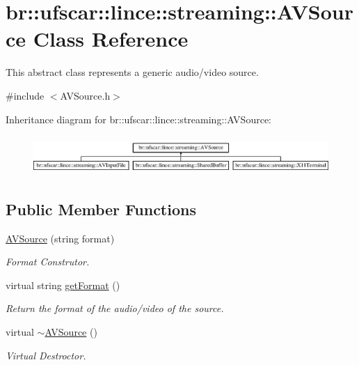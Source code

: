 \hypertarget{classbr_1_1ufscar_1_1lince_1_1streaming_1_1AVSource}{
\section{br::ufscar::lince::streaming::AVSource Class Reference}
\label{classbr_1_1ufscar_1_1lince_1_1streaming_1_1AVSource}
}


This abstract class represents a generic audio/video source.  




{\ttfamily \#include $<$AVSource.h$>$}

Inheritance diagram for br::ufscar::lince::streaming::AVSource:\begin{figure}[H]
\begin{center}
\leavevmode
\includegraphics[height=1.49933cm]{classbr_1_1ufscar_1_1lince_1_1streaming_1_1AVSource}
\end{center}
\end{figure}
\subsection*{Public Member Functions}
\begin{DoxyCompactItemize}
\item 
\hyperlink{classbr_1_1ufscar_1_1lince_1_1streaming_1_1AVSource_a95fc248b15a4f203ac68e97da703b771}{AVSource} (string format)
\begin{DoxyCompactList}\small\item\em Format Construtor. \item\end{DoxyCompactList}\item 
virtual string \hyperlink{classbr_1_1ufscar_1_1lince_1_1streaming_1_1AVSource_aa3023323ba8e385f73c4abbeee5f5881}{getFormat} ()
\begin{DoxyCompactList}\small\item\em Return the format of the audio/video of the source. \item\end{DoxyCompactList}\item 
virtual \hyperlink{classbr_1_1ufscar_1_1lince_1_1streaming_1_1AVSource_af816deeeec9a44dbaba113dc91612d26}{$\sim$AVSource} ()
\begin{DoxyCompactList}\small\item\em Virtual Destroctor. \item\end{DoxyCompactList}\end{DoxyCompactItemize}
